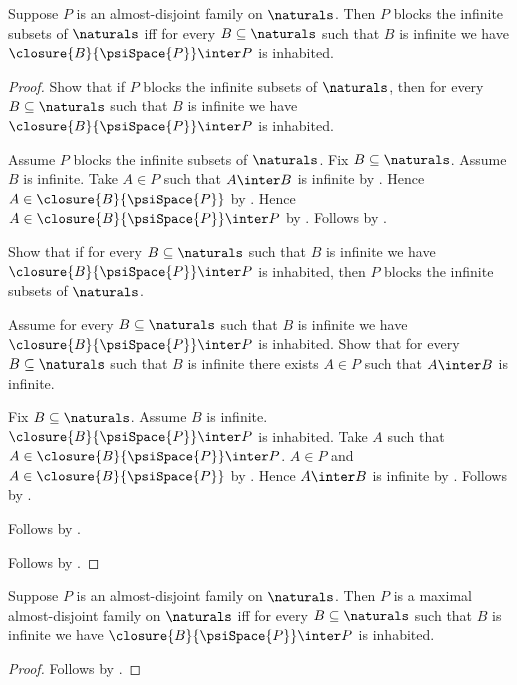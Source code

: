 \begin{theorem}\label{psi_blocking_iff_family_closure_hit}
    Suppose $P$ is an almost-disjoint family on $\naturals$.
    Then $P$ blocks the infinite subsets of $\naturals$ iff
        for every $B\subseteq\naturals$ such that $B$ is infinite
            we have $\closure{B}{\psiSpace{P}}\inter P$ is inhabited.
\end{theorem}
\begin{proof}
    Show that if $P$ blocks the infinite subsets of $\naturals$, then
        for every $B\subseteq\naturals$ such that $B$ is infinite
            we have $\closure{B}{\psiSpace{P}}\inter P$ is inhabited.
    \begin{subproof}
        Assume $P$ blocks the infinite subsets of $\naturals$.
        Fix $B\subseteq\naturals$.
        Assume $B$ is infinite.
        Take $A\in P$ such that $A\inter B$ is infinite
            by .
        Hence $A\in\closure{B}{\psiSpace{P}}$ by
            .
        Hence $A\in\closure{B}{\psiSpace{P}}\inter P$ by .
        Follows by \auto.
    \end{subproof}
    Show that if for every $B\subseteq\naturals$ such that $B$ is infinite
            we have $\closure{B}{\psiSpace{P}}\inter P$ is inhabited,
        then $P$ blocks the infinite subsets of $\naturals$.
    \begin{subproof}
        Assume for every $B\subseteq\naturals$ such that $B$ is infinite
            we have $\closure{B}{\psiSpace{P}}\inter P$ is inhabited.
        Show that for every $B\subseteq\naturals$ such that $B$ is infinite
            there exists $A\in P$ such that $A\inter B$ is infinite.
        \begin{subproof}
            Fix $B\subseteq\naturals$.
            Assume $B$ is infinite.
            $\closure{B}{\psiSpace{P}}\inter P$ is inhabited.
            Take $A$ such that $A\in\closure{B}{\psiSpace{P}}\inter P$.
            $A\in P$ and $A\in\closure{B}{\psiSpace{P}}$ by .
            Hence $A\inter B$ is infinite by
                .
            Follows by \auto.
        \end{subproof}
        Follows by .
    \end{subproof}
    Follows by \auto.
\end{proof}

\begin{corollary}\label{psi_maximal_family_iff_every_infinite_natural_set_has_family_closure_point}
    Suppose $P$ is an almost-disjoint family on $\naturals$.
    Then $P$ is a maximal almost-disjoint family on $\naturals$ iff
        for every $B\subseteq\naturals$ such that $B$ is infinite
            we have $\closure{B}{\psiSpace{P}}\inter P$ is inhabited.
\end{corollary}
\begin{proof}
    Follows by
        .
\end{proof}

